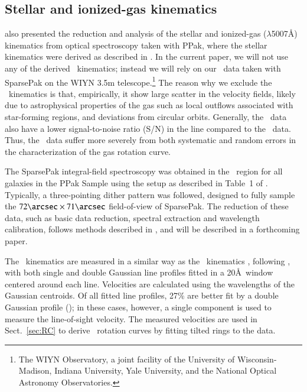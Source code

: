 \documentclass[traditabstract]{aa} %
\begin{document}



\subsection{Stellar and ionized-gas kinematics}
\label{sec:Kinematics}
 also presented the reduction and analysis of the stellar and 
ionized-gas (\oiii$\lambda$5007\AA) kinematics from optical spectroscopy taken with PPak,
where the stellar kinematics were derived as described in \cite{westfall2011a}.
In the current paper, we will not use any of the derived \oiii\ kinematics; instead we
will rely on our \halp\ data taken with SparsePak on the WIYN 3.5m 
telescope.\footnote{The WIYN Observatory, a joint facility of the University of
Wisconsin-Madison, Indiana University, Yale University, and the National Optical Astronomy
Observatories.}
The reason why we exclude the \oiii\ kinematics is that, empirically, it show
large scatter in the velocity fields, likely due to astrophysical properties of the gas
such as local outflows associated with star-forming regions, and deviations from circular
orbits. Generally, the \oiii\ data also have a lower signal-to-noise ratio (S/N) in the
line compared to the \halp\ data. Thus, the \oiii\ data suffer more severely from both
systematic and random errors in the characterization of the gas rotation curve.

The SparsePak integral-field spectroscopy was obtained in the \halp\ region for all
galaxies in the PPak Sample using the setup as described in Table~1 of 
. Typically, a three-pointing dither pattern was followed,
designed to fully sample the $72\arcsec \times 71\arcsec$ field-of-view of SparsePak. The
reduction of these data, such as basic data reduction, spectral extraction and wavelength
calibration, follows methods described in \cite{andersen2006}, and will be described in a
forthcoming paper.

The \halp\ kinematics are measured in a similar way as the \oiii\ kinematics 
, following \cite{andersen2006, andersen2008}, with both
single and double Gaussian line profiles fitted in a 20\AA\ window centered around each
line.
Velocities are calculated using the wavelengths of the Gaussian centroids. Of all fitted 
line profiles, 27\% are better fit by a double Gaussian profile (\citealt{andersen2008});
in these cases, however, a single component is used to measure the line-of-sight velocity.
The measured velocities are used in Sect.~\ref{sec:RC} to derive \halp\ rotation curves by
fitting tilted rings to the data.
\end{document}
